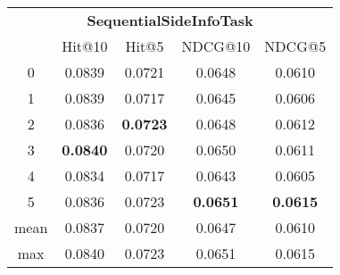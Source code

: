 \documentclass{article}
\begin{document}
 

\begin{tabular}{c|cccc}

\multicolumn{5}{c}{\textbf{SequentialSideInfoTask}} \\
\noalign{\smallskip}
\noalign{\smallskip}
\toprule
\multicolumn{1}{c}{Template ID} & \multicolumn{1}{|c}{Hit@10} & \multicolumn{1}{c}{Hit@5} & \multicolumn{1}{c}{NDCG@10} & \multicolumn{1}{c}{NDCG@5} \\
\midrule
0 & 0.0839 & 0.0721 & 0.0648 & 0.0610 \\
1 & 0.0839 & 0.0717 & 0.0645 & 0.0606 \\
2 & 0.0836 & \textbf{0.0723} & 0.0648 & 0.0612 \\
3 & \textbf{0.0840} & 0.0720 & 0.0650 & 0.0611 \\
4 & 0.0834 & 0.0717 & 0.0643 & 0.0605 \\
5 & 0.0836 & 0.0723 & \textbf{0.0651} & \textbf{0.0615} \\
\midrule
mean & 0.0837 & 0.0720 & 0.0647 & 0.0610 \\
max & 0.0840 & 0.0723 & 0.0651 & 0.0615 \\
\bottomrule

\end{tabular}
\end{document}

